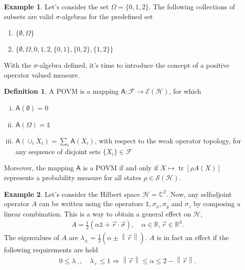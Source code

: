 \documentclass[a4paper,12pt]{wihuri}
\theoremstyle{definition}
\newtheorem{definition}{Definition}
\newtheorem{example}{Example}
\numberwithin{definition}{section}
\numberwithin{example}{section}
\numberwithin{theorem}{section}
\numberwithin{proposition}{section}
\numberwithin{lemma}{section}
\newcommand{\hi}{\mathcal{H}}%
\newcommand{\salg}{\mathcal{F}}%
\newcommand{\tila}{\mathcal{S}}%
\newcommand{\effect}{\mathcal{E}}%
\newcommand{\A}{\mathsf{A}}%
\newcommand{\id}{\mathds{1}}
\newcommand{\cc}{\mathbb{C}^2}%
\newcommand{\real}{\mathbb{R}}%
\DeclareMathOperator{\tr}{tr}
\newcommand{\norm}[1]{\left\lVert#1\right\rVert}
\begin{document}
\begin{example}
Let's consider the set $\Omega = \lbrace 0, 1, 2 \rbrace$. The following collections of subsets are valid $\sigma$-algebras for the predefined set
\begin{enumerate}[$\bullet$]
\item $\lbrace \emptyset, \Omega\rbrace$
\item $\lbrace \emptyset, \Omega, 0, 1, 2, \lbrace 0,1\rbrace, \lbrace0,2\rbrace, \lbrace1,2\rbrace \rbrace$
\end{enumerate}

\end{example}
With the $\sigma$-algebra defined, it's time to introduce the concept of a positive operator valued measure.
\begin{definition}
A POVM is a mapping $\A : \salg \rightarrow \effect(\hi)$, for which
\begin{enumerate}[i)]
\item $\A(\emptyset) = 0$
\item $\A(\Omega) = \id$
\item $\A(\cup_i X_i) = \sum_i \A(X_i)$, \quad with respect to the weak operator topology, for any sequence of disjoint sets $\lbrace X_i \rbrace \in \salg$
\end{enumerate}
\end{definition} 
\noindent Moreover, the mapping $\A$ is a POVM if and only if $X \mapsto \tr[\rho A(X)]$ represents a probability measure for all states $\rho \in \tila(\hi)$.


\begin{example}\label{qubitobs}
Let's consider the Hilbert space $\hi = \cc$. Now, any selfadjoint operator $A$ can be written using the operators $\id, \sigma_x, \sigma_y$ and $\sigma_z$ by composing a linear combination. This is a way to obtain a general effect on $\hi$,
\begin{align*}
A = \frac{1}{2}(\alpha \id + \vec{r}\cdot\vec{\sigma}), \quad \alpha \in \real, \vec{r} \in \real^3\text{.}
\end{align*}
The eigenvalues of $A$ are $\lambda_{\pm} = \frac{1}{2}(\alpha \pm \norm{\vec{r}})$. $A$ is in fact an effect if the following requirements are held
\begin{align*}
0 \leq \lambda_{-}, \quad \lambda_{+} \leq 1 \Rightarrow \norm{\vec{r}} \leq \alpha \leq 2 - \norm{\vec{r}}\text{.}
\end{align*}
\end{example}
\end{document}
